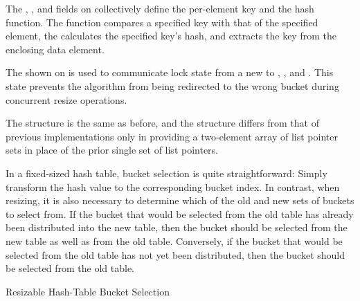 \begin{fcvref}
The , , and  fields on
collectively define the per-element key and the hash function.
The  function compares a specified key with that of
the specified element,
the  calculates the specified key's hash,
and  extracts the key from the enclosing data
element.

The  shown on 
is used to communicate lock state from a new 
to , , and .
This state prevents the algorithm from being redirected to the wrong
bucket during concurrent resize operations.

The  structure is the same as before, and the
 structure differs from that of previous implementations
only in providing a two-element array of list pointer sets in place of
the prior single set of list pointers.

In a fixed-sized hash table, bucket selection is quite straightforward:
Simply transform the hash value to the corresponding bucket index.
In contrast, when resizing, it is also necessary to determine which
of the old and new sets of buckets to select from.
If the bucket that would be selected from the old table has already
been distributed into the new table, then the bucket should be selected
from the new table as well as from the old table.
Conversely, if the bucket that would be selected from the old table
has not yet been distributed, then the bucket should be selected from
the old table.
\end{fcvref}

\begin{listing}

\caption{Resizable Hash-Table Bucket Selection}
\label{lst:datastruct:Resizable Hash-Table Bucket Selection}
\end{listing}

